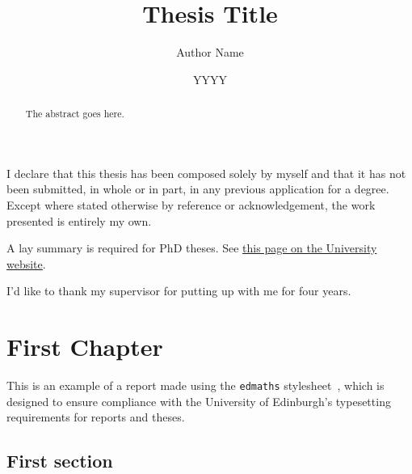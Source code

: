 \documentclass[12pt,twoside]{report}
\title{Thesis Title}
\author{Author Name}
\date{YYYY}
\begin{document}
\flushbottom
{}

\maketitle

\begin{declaration}
	I declare that this thesis has been composed solely by myself and that it has not been
	submitted, in whole or in part, in any previous application for a degree. Except where
	stated otherwise by reference or acknowledgement, the work presented is entirely my
	own.
\end{declaration}

\begin{abstract}
	The abstract goes here.
\end{abstract}

\begin{laysummary}
	A lay summary is required for PhD theses. See \href{https://www.ed.ac.uk/sites/default/files/atoms/files/lay_summary_in_theses.pdf}{this page on the University website}.
\end{laysummary}

\dedication{In memory of my sanity.}

\begin{acknowledgements}
	I'd like to thank my supervisor for putting up with me for four years.
\end{acknowledgements}


\tableofcontents

\newpage
{}

\chapter{First Chapter}

This is an example of a report made using the \texttt{edmaths} stylesheet~\cite{koeppe2007}, which is designed to ensure compliance with the University of Edinburgh's typesetting requirements for reports and theses.

\section{First section}
\end{document}
